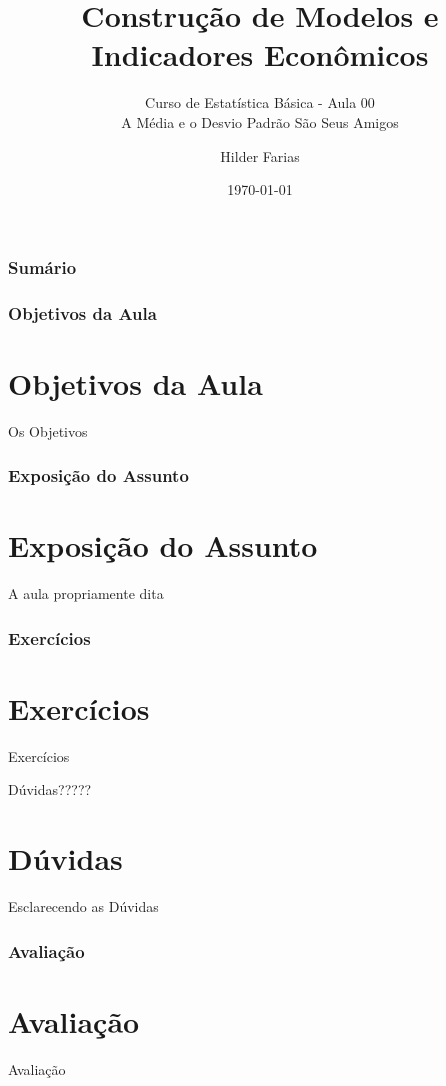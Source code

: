 \documentclass[11pt]{beamer}
\author{Hilder Farias}
\title{Construção de Modelos e Indicadores Econômicos}
\subtitle{Curso de Estatística Básica - Aula 00 \\
		  A Média e o Desvio Padrão São Seus Amigos}
\institute{PPGE-FACECON-ICSA}
\date{\today}
\begin{document}
\begin{frame}
\titlepage
\end{frame}


\begin{frame}
\frametitle{Sumário}
\begin{multicols}{2}
		\tableofcontents
\end{multicols}
\end{frame}





\begin{frame}
\frametitle{Objetivos da Aula}
\section{Objetivos da Aula}
Os Objetivos

\cite{Coutinho2016,DeLima2018,Vogt2016}
\end{frame}



\begin{frame}
\frametitle{Exposição do Assunto}
\section{Exposição do Assunto}

A aula propriamente dita
\cite{Almeida2017,Almeida2009a}

\end{frame}


\begin{frame}
\frametitle{Exercícios}
\section{Exercícios}

Exercícios


\end{frame}


\begin{frame}{Dúvidas?????}
\section{Dúvidas}

Esclarecendo as Dúvidas

\end{frame}



\begin{frame}
\frametitle{Avaliação}
\section{Avaliação}

Avaliação


\end{frame}
\end{document}
